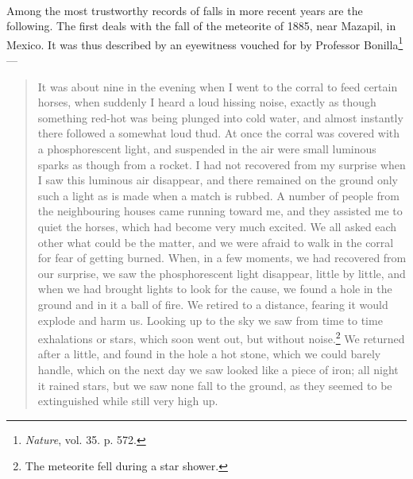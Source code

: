 \documentclass[a4paper, 12pt, oneside, polutonikogreek, english]{article}
\begin{document}
\paragraph{}
Among the most trustworthy records of falls in more recent years are the following. The first deals with the fall of the meteorite of 1885, near Mazapil, in Mexico. It was thus described by an eyewitness vouched for by Professor Bonilla\footnote{\emph{Nature}, vol. 35. p. 572.} ---
\begin{quotation}
It was about nine in the evening when I went to the corral to feed certain horses, when suddenly I heard a loud hissing noise, exactly as though something red-hot was being plunged into cold water, and almost instantly there followed a somewhat loud thud. At once the corral was covered with a phosphorescent light, and suspended in the air were small luminous sparks as though from a rocket. I had not recovered from my surprise when I saw this luminous air disappear, and there remained on the ground only such a light as is made when a match is rubbed. A number of people from the neighbouring houses came running toward me, and they assisted me to quiet the horses, which had become very much excited. We all asked each other what could be the matter, and we were afraid to walk in the corral for fear of getting burned. When, in a few moments, we had recovered from our surprise, we saw the phosphorescent light disappear, little by little, and when we had brought lights to look for the cause, we found a hole in the ground and in it a ball of fire. We retired to a distance, fearing it would explode and harm us. Looking up to the sky we saw from time to time exhalations or stars, which soon went out, but without noise.\footnote{The meteorite fell during a star shower.} We returned after a little, and found in the hole a hot stone, which we could barely handle, which on the next day we saw looked like a piece of iron; all night it rained stars, but we saw none fall to the ground, as they seemed to be extinguished while still very high up.
\end{quotation}
\end{document}
